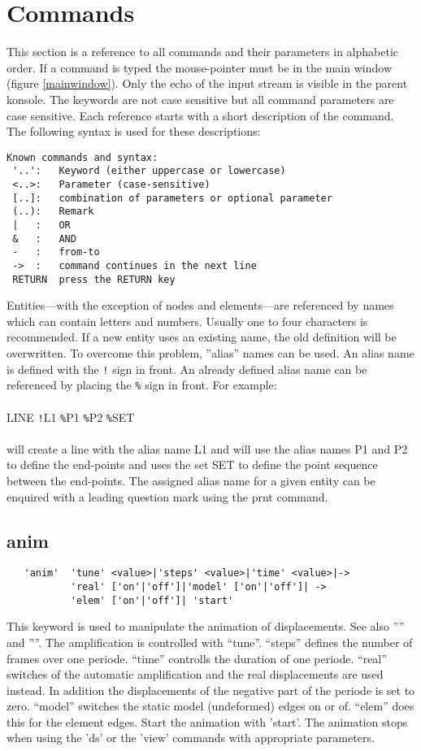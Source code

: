 \documentclass{article}
\begin{document}
\section{\label{Commands}Commands}
This section is a reference to all commands and their parameters in alphabetic order. If a command is typed the mouse-pointer must be in the main window (figure \ref{mainwindow}). Only the echo of the input stream is visible in the parent konsole. The keywords are not case sensitive but all command parameters are case sensitive. Each reference starts with a short description of the command. The following syntax is used for these descriptions:
\begin{verbatim}
Known commands and syntax:
 '..':   Keyword (either uppercase or lowercase)
 <..>:   Parameter (case-sensitive)
 [..]:   combination of parameters or optional parameter
 (..):   Remark
 |   :   OR
 &   :   AND
 -   :   from-to
 ->  :   command continues in the next line
 RETURN  press the RETURN key 
\end{verbatim}
Entities---with the exception of nodes and elements---are referenced by names which can contain letters and numbers. Usually one to four characters is recommended. If a new entity uses an existing name, the old definition will be overwritten. To overcome this problem, ''alias'' names can be used. An alias name is defined with the \verb_!_ sign in front. An already defined alias name can be referenced by placing the \verb_%_ sign in front. For example:\\\\
LINE \verb_!_L1 \verb_%_P1 \verb_%_P2 \verb_%_SET\\\\will create a line with the alias name L1 and will use the alias names P1 and P2 to define the end-points and uses the set SET to define the point sequence between the end-points. The assigned alias name for a given entity can be enquired with a leading question mark using the prnt command.


\subsection{\label{anim}anim}
\begin{verbatim}
   'anim'  'tune' <value>|'steps' <value>|'time' <value>|->
           'real' ['on'|'off']|'model' ['on'|'off']| ->
           'elem' ['on'|'off']| 'start'
\end{verbatim}
This keyword is used to manipulate the animation of displacements. See also '''' and ''''. The amplification is controlled with ``tune''. ``steps'' defines the number of frames over one periode. ``time'' controlls the duration of one periode. ``real'' switches of the automatic amplification and the real displacements are used instead. In addition the displacements of the negative part of the periode is set to zero. ``model'' switches the static model (undeformed) edges on or of. ``elem'' does this for the element edges. Start the animation with 'start'. The animation stops when using the 'ds' or the 'view' commands with appropriate parameters.
\end{document}

